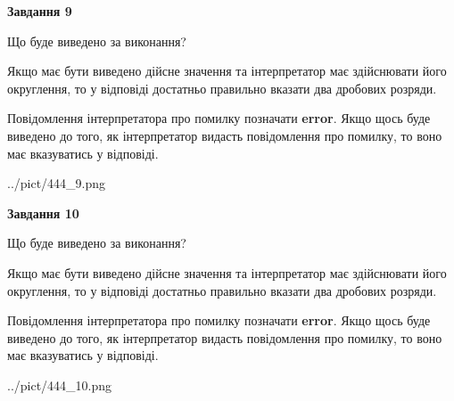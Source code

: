 \documentclass[12pt, ukrainian]{article}
\begin{document}
{\begin {Large}
{\begin {center}\textbf{Завдання 9}\end {center}}\par
Що буде виведено за виконання? \par

Якщо має бути виведено дійсне значення та інтерпретатор має здійснювати його округлення, 
то у відповіді достатньо правильно вказати два дробових розряди.

Повідомлення інтерпретатора про помилку позначати \textbf{error}.
Якщо щось буде виведено до того, як інтерпретатор видасть повідомлення про помилку, 
то воно має вказуватись у відповіді. \par

\begin{center}
	{../pict/444_9.png}
\end{center}
\newpage

{\begin {center}\textbf{Завдання 10}\end {center}}\par
Що буде виведено за виконання? \par

Якщо має бути виведено дійсне значення та інтерпретатор має здійснювати його округлення, 
то у відповіді достатньо правильно вказати два дробових розряди.

Повідомлення інтерпретатора про помилку позначати \textbf{error}.
Якщо щось буде виведено до того, як інтерпретатор видасть повідомлення про помилку, 
то воно має вказуватись у відповіді. \par

\begin{center}
	{../pict/444_10.png}
\end{center}
\newpage

\end {Large}}
\end{document}
